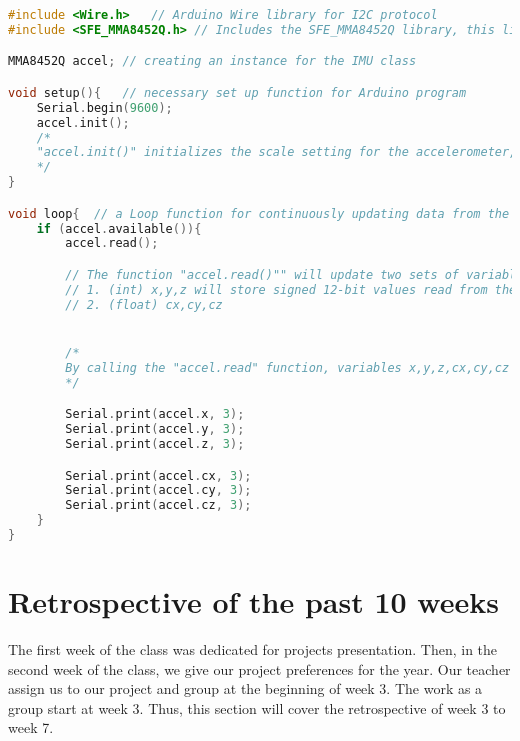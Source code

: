 \documentclass[letterpaper,10pt,onecolumn]{IEEEtran}
\begin{document}
\begin{lstlisting}[language=c]
#include <Wire.h>	// Arduino Wire library for I2C protocol 
#include <SFE_MMA8452Q.h> // Includes the SFE_MMA8452Q library, this library depends on the in using IMU model

MMA8452Q accel;	// creating an instance for the IMU class

void setup(){	// necessary set up function for Arduino program 
	Serial.begin(9600);	
	accel.init();
	/* 
	"accel.init()" initializes the scale setting for the accelerometer, MMA8452Q supports SCALE_2G, SCALE_4G and SCALE_8G, they represent the scale of +/-2g, 4g, and 8g respectively, so for instance, using 2g scale will be a function like "accel.init(SCALE_2G)"
	*/
}

void loop{	// a Loop function for continuously updating data from the accelerometer  
	if (accel.available()){
	    accel.read();	

		// The function "accel.read()"" will update two sets of variables: 
		// 1. (int) x,y,z will store signed 12-bit values read from the accelerometer
		// 2. (float) cx,cy,cz 


		/* 
		By calling the "accel.read" function, variables x,y,z,cx,cy,cz in "accel" class have been updated, the following code allows the program to print out all data continuously on the Arduino Serial monitor, and these variables would be the data to be processed by the aligned algorithm in our system. 
		*/

		Serial.print(accel.x, 3);
		Serial.print(accel.y, 3);
		Serial.print(accel.z, 3);

		Serial.print(accel.cx, 3);
		Serial.print(accel.cy, 3);
		Serial.print(accel.cz, 3);
	}
}

\end{lstlisting}



\section{Retrospective of the past 10 weeks}
The first week of the class was dedicated for projects presentation. Then, in the second week of the class, we give our project preferences for the year. Our teacher assign us to our project and group at the beginning of week 3. The work as a group start at week 3. Thus, this section will cover the retrospective of week 3 to week 7.
\end{document}
